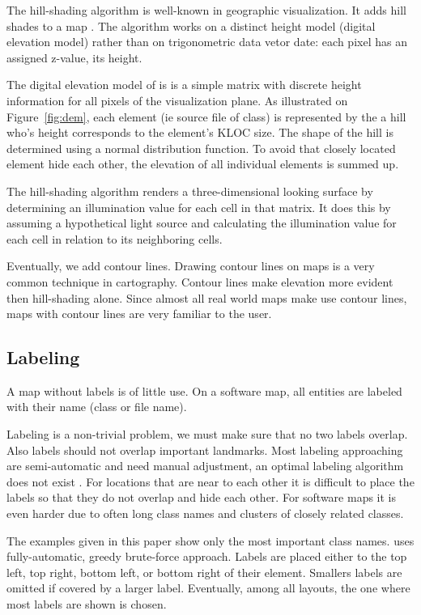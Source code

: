 The hill-shading algorithm is well-known in geographic visualization. It adds hill shades to a map \cite{Sloc05a}. The algorithm works on a distinct height model (digital elevation model) rather than on trigonometric data vetor date: each pixel has an assigned z-value, its height. 

The digital elevation model of \TOOL is is a simple matrix with discrete height information for all pixels of the visualization plane. As illustrated on Figure~\ref{fig:dem}, each element (ie source file of class) is represented by the a hill who's height corresponds to the element's KLOC size. The shape of the hill is determined using a normal distribution function. To avoid that closely located element hide each other, the elevation of all individual elements is summed up.


The hill-shading algorithm renders a three-dimensional looking surface by determining an illumination value for each cell in that matrix. It does this by assuming a hypothetical light source and calculating the illumination value for each cell in relation to its neighboring cells.

Eventually, we add contour lines. Drawing contour lines on maps is a very common technique in cartography. Contour lines make elevation more evident then hill-shading alone. Since almost all real world maps make use contour lines, maps with contour lines are very familiar to the user.


\subsection{Labeling}

A map without labels is of little use. On a software map, all entities are labeled with their name (class or file name).

Labeling is a non-trivial problem, we must make sure that no two labels overlap. Also labels should not overlap important landmarks. Most labeling approaching are semi-automatic and need manual adjustment, an optimal labeling algorithm does not exist \cite{Sloc05a}. For locations that are near to each other it is difficult to place the labels so that they do not overlap and hide each other. For software maps it is even harder due to often long class names and clusters of closely related classes.

The examples given in this paper show only the most important class names. \TOOL uses fully-automatic, greedy brute-force approach. Labels are placed either to the top left, top right, bottom left, or bottom right of their element. Smallers labels are omitted if covered by a larger label. Eventually, among all layouts, the one where most labels are shown is chosen.


